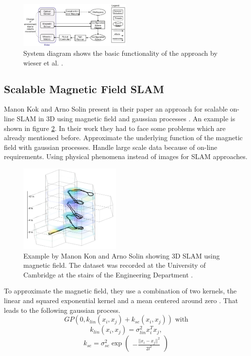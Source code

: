 \begin{figure}[h!]
	\centering
	\includegraphics[width=0.5\textwidth]{images/wieser_system.png}
	\caption{
            System diagram shows the basic functionality of the approach by wieser et al. 
            \cite{wieser_slam_indoor_2014}.
        }
	\label{fig:wieser_system}
\end{figure}

\subsection{Scalable Magnetic Field SLAM}
Manon Kok and Arno Solin present in their paper an approach for scalable on-line SLAM in 3D using
magnetic field and gaussian processes \cite{kok_scalable_2018}. An example is shown
in figure \ref{fig:kok_3d}. In their work they had to face some problems which are already mentioned 
before. Approximate the underlying function of the magnetic field with gaussian processes. Handle 
large scale data because of on-line requirements. Using physical phenomena instead of images for 
SLAM approaches.

\begin{figure}[h!]
	\centering
	\includegraphics[width=0.45\textwidth]{images/kok_3d.png}
	\caption{
        Example by Manon Kon and Arno Solin showing 3D SLAM using magnetic field.
        The dataset was recorded at the University of Cambridge at the stairs of
        the Engineering Department \cite{kok_scalable_2018}.
        }
	\label{fig:kok_3d}
\end{figure}

To approximate the magnetic field, they use a combination of two kernels, the linear and squared
exponential kernel and a mean centered around zero \cite{kok_scalable_2018}. That leads to the 
following gaussian process.
$$
GP(0, k_{lin}(x_i, x_j) + k_{se}(x_i, x_j)) \text{ with}
$$
$$
k_{lin}(x_i, x_j) = \sigma_{lin}^2 x_i^T x_j, 
$$
$$
k_{se} = \sigma_{se}^2 \exp 
\begin{pmatrix}
    -\frac{||x_i - x_j||^2}{2l^2}
\end{pmatrix}
$$

